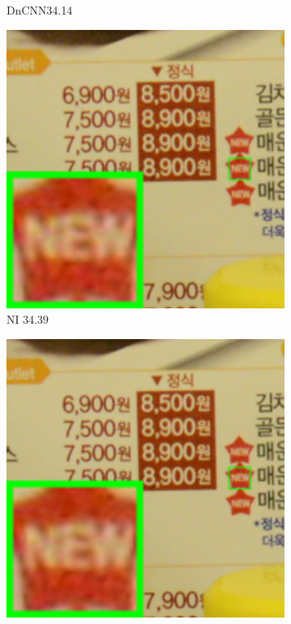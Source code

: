 \begin{figure}
\begin{subfigure}[t]{0.19\textwidth}
	   \caption{DnCNN34.14}
    \end{subfigure}
    \hfill
    \begin{subfigure}[t]{0.19\textwidth}
        \centering
        \includegraphics[width=1\textwidth]{images/guided/resize_br_NI_CC_Noisy_Nikon_D800_ISO_3200_A3_66.png}
		\caption{NI 34.39}
    \end{subfigure}
    \hfill
    \begin{subfigure}[t]{0.19\textwidth}
        \centering
        \includegraphics[width=1\textwidth]{images/guided/resize_br_NC_CC_Noisy_Nikon_D800_ISO_3200_A3_66.png}

\end{subfigure}
\end{figure}
